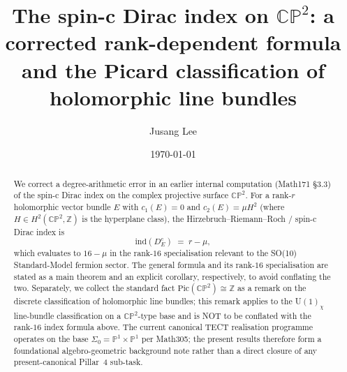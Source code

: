 



\title{The spin-c Dirac index on $\mathbb{CP}^2$: a corrected rank-dependent
formula and the Picard classification of holomorphic line bundles}

\author{Jusang Lee}

\date{\today}

\begin{abstract}
We correct a degree-arithmetic error in an earlier internal computation
(Math171 \S3.3) of the spin-c Dirac index on the complex projective surface
$\mathbb{CP}^2$. For a rank-$r$ holomorphic vector bundle $E$ with
$c_1(E) = 0$ and $c_2(E) = \mu H^2$ (where $H \in H^2(\mathbb{CP}^2,
\mathbb{Z})$ is the hyperplane class), the Hirzebruch--Riemann--Roch /
spin-c Dirac index is
\[
\mathrm{ind}(D_E^c) \;=\; r - \mu,
\]
which evaluates to $16 - \mu$ in the rank-$16$ specialisation relevant to
the SO(10) Standard-Model fermion sector. The general formula and its
rank-$16$ specialisation are stated as a main theorem and an explicit
corollary, respectively, to avoid conflating the two. Separately, we
collect the standard fact $\mathrm{Pic}(\mathbb{CP}^2) \cong \mathbb{Z}$
as a remark on the discrete classification of holomorphic line bundles;
this remark applies to the U$(1)_\chi$ line-bundle classification on a
$\mathbb{CP}^2$-type base and is NOT to be conflated with the rank-$16$
index formula above. The current canonical TECT realisation programme
operates on the base $\Sigma_0 = \mathbb{P}^1 \times \mathbb{P}^1$ per
Math305; the present results therefore form a foundational
algebro-geometric background note rather than a direct closure of any
present-canonical Pillar~4 sub-task.
\end{abstract}

